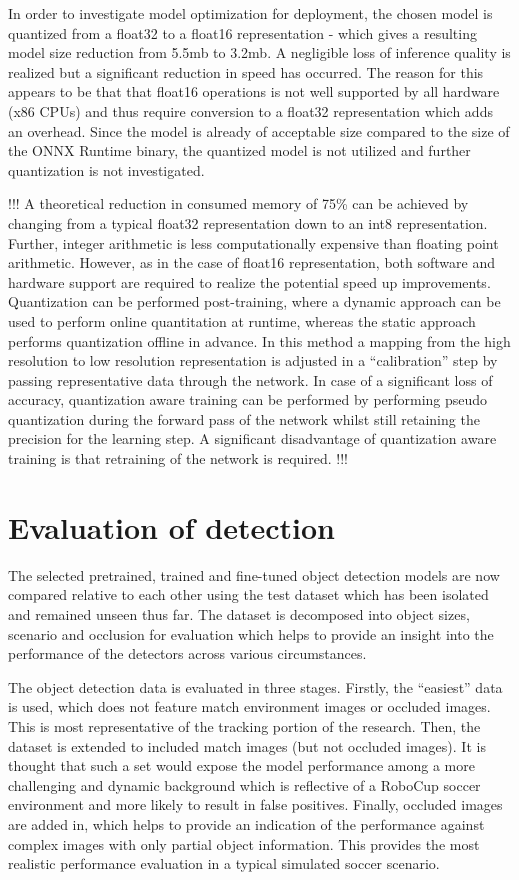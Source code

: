 \documentclass[a4paper,twoside,12pt]{report}
\begin{document}
In order to investigate model optimization for deployment, the chosen model is quantized from a float32 to a float16 representation - which gives a resulting model size reduction from 5.5mb to 3.2mb. A negligible loss of inference quality is realized but a significant reduction in speed has occurred. The reason for this appears to be that that float16 operations is not well supported by all hardware (x86 CPUs) and thus require conversion to a float32 representation which adds an overhead. Since the model is already of acceptable size compared to the size of the ONNX Runtime binary, the quantized model is not utilized and further quantization is not investigated.

!!!
A theoretical reduction in consumed memory of 75\% can be achieved by changing from a typical float32 representation down to an int8 representation. Further, integer arithmetic is less computationally expensive than floating point arithmetic. However, as in the case of float16 representation, both software and hardware support are required to realize the potential speed up improvements. Quantization can be performed post-training, where a dynamic approach can be used to perform online quantitation at runtime, whereas the static approach performs quantization offline in advance. In this method a mapping from the high resolution to low resolution representation is adjusted in a ``calibration'' step by passing representative data through the network. In case of a significant loss of accuracy, quantization aware training can be performed by performing pseudo quantization during the forward pass of the network whilst  still retaining the precision for the learning step. A significant disadvantage of quantization aware training is that retraining of the network is required. \citep{quantization}
!!!
\section{Evaluation of detection}

The selected pretrained, trained and fine-tuned object detection models are now compared relative to each other using the test dataset which has been isolated and remained unseen thus far. The dataset is decomposed into object sizes, scenario and occlusion for evaluation which helps to provide an insight into the performance of the detectors across various circumstances. 

The object detection data is evaluated in three stages. Firstly, the ``easiest'' data is used, which does not feature match environment images or occluded images. This is most representative of the tracking portion of the research. Then, the dataset is extended to included match images (but not occluded images). It is thought that such a set would expose the model performance among a more challenging and dynamic background which is reflective of a RoboCup soccer environment and more likely to result in false positives. Finally, occluded images are added in, which helps to provide an indication of the performance against complex images with only partial object information. This provides the most realistic performance evaluation in a typical simulated soccer scenario. 
\end{document}
